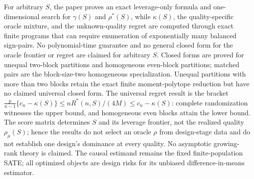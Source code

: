 \documentclass{article}
\begin{document}
For arbitrary \(S\), the paper proves an exact leverage-only formula and one-dimensional search for \(\gamma(S)\) and \(\rho^*(S)\), while \(\kappa(S)\), the quality-specific oracle mixture, and the unknown-quality regret are computed through exact finite programs that can require enumeration of exponentially many balanced sign-pairs. No polynomial-time guarantee and no general closed form for the oracle frontier or regret are claimed for arbitrary \(S\). Closed forms are proved for unequal two-block partitions and homogeneous even-block partitions; matched pairs are the block-size-two homogeneous specialization. Unequal partitions with more than two blocks retain the exact finite moment-polytope reduction but have no claimed universal closed form. The universal regret result is the bracket \(\frac{p}{n-1}\{c_n-\kappa(S)\}\leq nR^*(n,S)/(4M)\leq c_n-\kappa(S)\): complete randomization witnesses the upper bound, and homogeneous even blocks attain the lower bound. The score matrix determines \(S\) and its leverage frontier, not the realized quality \(\rho_{\mu}(S)\); hence the results do not select an oracle \(\rho\) from design-stage data and do not establish one design's dominance at every quality. No asymptotic growing-rank theory is claimed. The causal estimand remains the fixed finite-population SATE; all optimized objects are design risks for its unbiased difference-in-means estimator.
\end{document}
